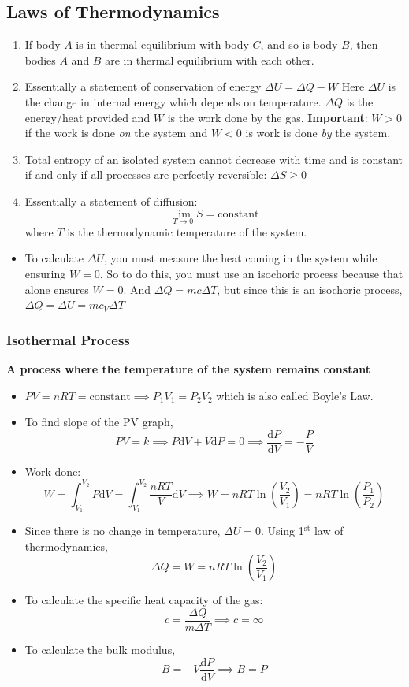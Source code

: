 \documentclass{scrartcl}
\begin{document}
    \subsection{Laws of Thermodynamics}
    \begin{enumerate}[start=0]
        \item If body $A$ is in thermal equilibrium with body $C$, and so is body $B$, then bodies $A$ and $B$ are in thermal equilibrium with each other.
        \item Essentially a statement of conservation of energy $\boxed{\Delta U=\Delta Q-W}$ Here $\Delta U$ is the change in internal energy which depends on temperature. $\Delta Q$ is the energy/heat provided and $W$ is the work done by the gas. \textbf{Important}: $W>0$ if the work is done \textit{on} the system and $W<0$ is work is done \textit{by} the system.
        \item Total entropy of an isolated system cannot decrease with time and is constant if and only if all processes are perfectly reversible: $\Delta S\geq0$
        \item Essentially a statement of diffusion: \[\lim_{T\to0}S=\text{constant}\] where $T$ is the thermodynamic temperature of the system.
    \end{enumerate}
    \begin{itemize}
        \item To calculate $\Delta U$, you must measure the heat coming in the system while ensuring $W=0$. So to do this, you must use an isochoric process because that alone ensures $W=0$. And $\Delta Q=mc\Delta T$, but since this is an isochoric process, $\Delta Q=\boxed{\Delta U=mc_V\Delta T}$
    \end{itemize}
    \subsubsection{Isothermal Process}
    \quad \textbf{A process where the temperature of the system remains constant}
    \begin{itemize}
        \item $PV=nRT=\text{constant}\implies P_1V_1=P_2V_2$ which is also called Boyle's Law.
        \item To find slope of the PV graph, \[PV=k\implies P\mathrm dV+V\mathrm dP=0\implies\boxed{\frac{\mathrm dP}{\mathrm dV}=-\frac PV}\]
        \item Work done: \[W=\int_{V_1}^{V_2}P\mathrm dV=\int_{V_1}^{V_2}\frac{nRT}V\mathrm dV\implies \boxed{W=nRT\ln\left(\frac{V_2}{V_1}\right)=nRT\ln\left(\frac{P_1}{P_2}\right)}\]
        \item Since there is no change in temperature, $\Delta U=0$. Using 1$^\text{st}$ law of thermodynamics, \[\Delta Q=W=nRT\ln\left(\frac{V_2}{V_1}\right)\]
        \item To calculate the specific heat capacity of the gas: \[c=\frac{\Delta Q}{m\Delta T}\implies\boxed{c=\infty}\]
        \item To calculate the bulk modulus, \[B=-V\frac{\mathrm dP}{\mathrm dV}\implies\boxed{B=P}\]
    \end{itemize}\newpage
\end{document}
